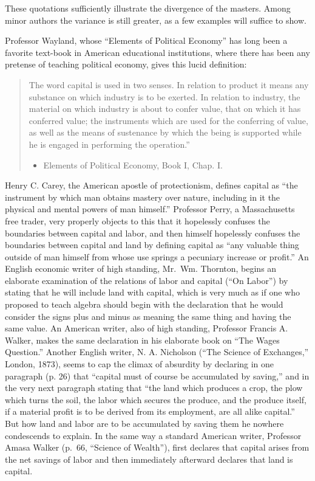 These quotations sufficiently illustrate the divergence of the masters.
Among minor authors the variance is still greater, as a few examples
will suffice to show.

Professor Wayland, whose ``Elements of Political Economy'' has long been
a favorite text-book in American educational institutions, where there
has been any pretense of teaching political economy, gives this lucid
definition:

\begin{quote}
The word capital is used in two senses. In relation to product it means
any substance on which industry is to be exerted. In relation to
industry, the material on which industry is about to confer value, that
on which it has conferred value; the instruments which are used for the
conferring of value, as well as the means of sustenance by which the
being is supported while he is engaged in performing the operation.''

\begin{itemize}
\tightlist
\item
  Elements of Political Economy, Book I, Chap. I.
\end{itemize}
\end{quote}

Henry C. Carey, the American apostle of protectionism, defines capital
as ``the instrument by which man obtains mastery over nature, including
in it the physical and mental powers of man himself.'' Professor Perry,
a Massachusetts free trader, very properly objects to this that it
hopelessly confuses the boundaries between capital and labor, and then
himself hopelessly confuses the boundaries between capital and land by
defining capital as ``any valuable thing outside of man himself from
whose use springs a pecuniary increase or profit.'' An English economic
writer of high standing, Mr.~Wm. Thornton, begins an elaborate
examination of the relations of labor and capital (``On Labor'') by
stating that he will include land with capital, which is very much as if
one who proposed to teach algebra should begin with the declaration that
he would consider the signs plus and minus as meaning the same thing and
having the same value. An American writer, also of high standing,
Professor Francis A. Walker, makes the same declaration in his elaborate
book on ``The Wages Question.'' Another English writer, N. A. Nicholson
(``The Science of Exchanges,'' London, 1873), seems to cap the climax of
absurdity by declaring in one paragraph (p. 26) that ``capital must of
course be accumulated by saving,'' and in the very next paragraph
stating that ``the land which produces a crop, the plow which turns the
soil, the labor which secures the produce, and the produce itself, if a
material profit is to be derived from its employment, are all alike
capital.'' But how land and labor are to be accumulated by saving them
he nowhere condescends to explain. In the same way a standard American
writer, Professor Amasa Walker (p.~66, ``Science of Wealth''), first
declares that capital arises from the net savings of labor and then
immediately afterward declares that land is capital.

